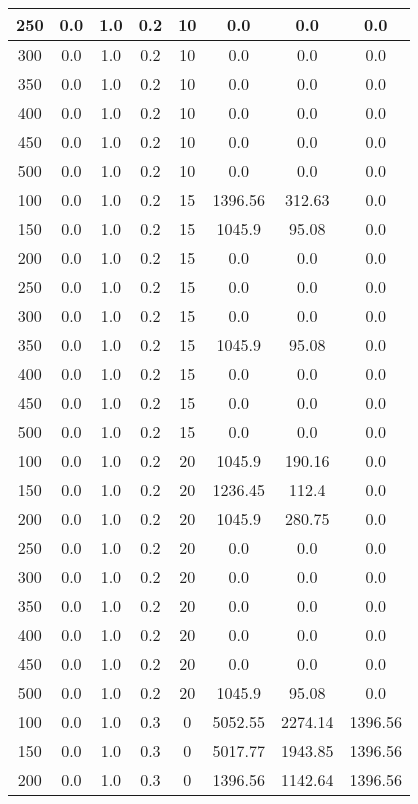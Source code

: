\documentclass[a4paper, 12pt]{extreport}
\begin{document}
\begin{itemize}
\begin{longtable}{|c|c|c|c|c|c|c|c|}
			250 & 0.0 & 1.0 & 0.2 & 10 & 0.0 & 0.0 & 0.0 \\\hline
			300 & 0.0 & 1.0 & 0.2 & 10 & 0.0 & 0.0 & 0.0 \\\hline
			350 & 0.0 & 1.0 & 0.2 & 10 & 0.0 & 0.0 & 0.0 \\\hline
			400 & 0.0 & 1.0 & 0.2 & 10 & 0.0 & 0.0 & 0.0 \\\hline
			450 & 0.0 & 1.0 & 0.2 & 10 & 0.0 & 0.0 & 0.0 \\\hline
			500 & 0.0 & 1.0 & 0.2 & 10 & 0.0 & 0.0 & 0.0 \\\hline
			100 & 0.0 & 1.0 & 0.2 & 15 & 1396.56 & 312.63 & 0.0 \\\hline
			150 & 0.0 & 1.0 & 0.2 & 15 & 1045.9 & 95.08 & 0.0 \\\hline
			200 & 0.0 & 1.0 & 0.2 & 15 & 0.0 & 0.0 & 0.0 \\\hline
			250 & 0.0 & 1.0 & 0.2 & 15 & 0.0 & 0.0 & 0.0 \\\hline
			300 & 0.0 & 1.0 & 0.2 & 15 & 0.0 & 0.0 & 0.0 \\\hline
			350 & 0.0 & 1.0 & 0.2 & 15 & 1045.9 & 95.08 & 0.0 \\\hline
			400 & 0.0 & 1.0 & 0.2 & 15 & 0.0 & 0.0 & 0.0 \\\hline
			450 & 0.0 & 1.0 & 0.2 & 15 & 0.0 & 0.0 & 0.0 \\\hline
			500 & 0.0 & 1.0 & 0.2 & 15 & 0.0 & 0.0 & 0.0 \\\hline
			100 & 0.0 & 1.0 & 0.2 & 20 & 1045.9 & 190.16 & 0.0 \\\hline
			150 & 0.0 & 1.0 & 0.2 & 20 & 1236.45 & 112.4 & 0.0 \\\hline
			200 & 0.0 & 1.0 & 0.2 & 20 & 1045.9 & 280.75 & 0.0 \\\hline
			250 & 0.0 & 1.0 & 0.2 & 20 & 0.0 & 0.0 & 0.0 \\\hline
			300 & 0.0 & 1.0 & 0.2 & 20 & 0.0 & 0.0 & 0.0 \\\hline
			350 & 0.0 & 1.0 & 0.2 & 20 & 0.0 & 0.0 & 0.0 \\\hline
			400 & 0.0 & 1.0 & 0.2 & 20 & 0.0 & 0.0 & 0.0 \\\hline
			450 & 0.0 & 1.0 & 0.2 & 20 & 0.0 & 0.0 & 0.0 \\\hline
			500 & 0.0 & 1.0 & 0.2 & 20 & 1045.9 & 95.08 & 0.0 \\\hline
			100 & 0.0 & 1.0 & 0.3 & 0 & 5052.55 & 2274.14 & 1396.56 \\\hline
			150 & 0.0 & 1.0 & 0.3 & 0 & 5017.77 & 1943.85 & 1396.56 \\\hline
			200 & 0.0 & 1.0 & 0.3 & 0 & 1396.56 & 1142.64 & 1396.56 \\\hline

\end{longtable}
\end{itemize}
\end{document}
